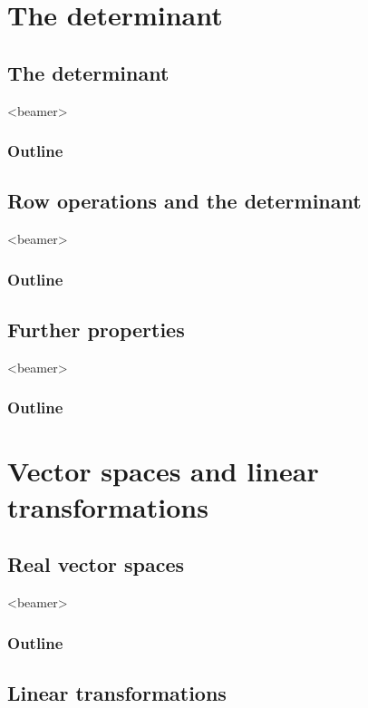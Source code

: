 \documentclass[handout,envcountsect,hyperref={colorlinks},notheorems]{beamer}
\theoremstyle{definition}
\theoremstyle{named}
\numberwithin{myalgctr}{section}
\begin{document}
\section{The determinant}\label{s:det}
\subsection{The determinant}\label{ss:det}
\begin{frame}<beamer>
             \frametitle{Outline}
           \end{frame}

\subsection{Row operations and the determinant}\label{ss:rowops}
\begin{frame}<beamer>
             \frametitle{Outline}
           \end{frame}

\subsection{Further properties}\label{ss:further}
\begin{frame}<beamer>
             \frametitle{Outline}
           \end{frame}

\section{Vector spaces and linear transformations}\label{s:vectorspace}
\subsection{Real vector spaces}\label{ss:vectorspace}
\begin{frame}<beamer>
             \frametitle{Outline}
           \end{frame}

\subsection{Linear transformations}\label{ss:transformation}
%
\end{document}
